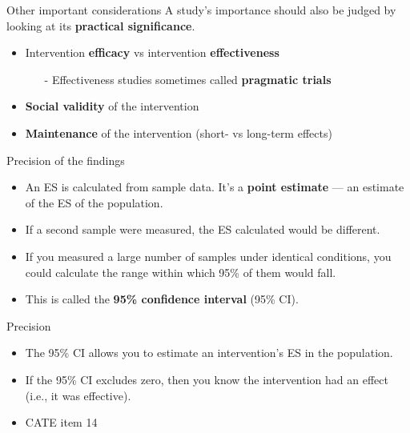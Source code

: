 \documentclass{beamer}
\begin{document}
% 
\begin{frame}{Other important considerations}
A study's importance should also be judged by looking at its \textbf{practical significance}. \\
	\begin{itemize}
	\item Intervention \textbf{efficacy} vs intervention \textbf{effectiveness}
		\begin{itemize}
		\item[-] Effectiveness studies sometimes called \textbf{pragmatic trials}
		\end{itemize}
	\item \textbf{Social validity} of the intervention
	\item \textbf{Maintenance} of the intervention (short- vs long-term effects)
	\end{itemize}
\end{frame}

% 
\begin{frame}{Precision of the findings}
	\begin{itemize}
	\item An ES is calculated from \alert{sample} data. It's a \textbf{point estimate} --- an estimate of the ES of the \alert{population}.
	\item If a second sample were measured, the ES calculated would be different.
	\item If you measured a large number of samples under identical conditions, you could calculate the range within which 95\% of them would fall. 	
	\item This is called the \textbf{95\% confidence interval} (95\% CI).
	\end{itemize}
\end{frame}

% 
\begin{frame}{Precision}
	\begin{itemize}
	\item The 95\% CI allows you to estimate an intervention's ES in the population.
	\item If the 95\% CI excludes zero, then you know the intervention had an effect (i.e., it was effective).
	\item CATE item 14
	\end{itemize}
\end{frame}
\end{document}
